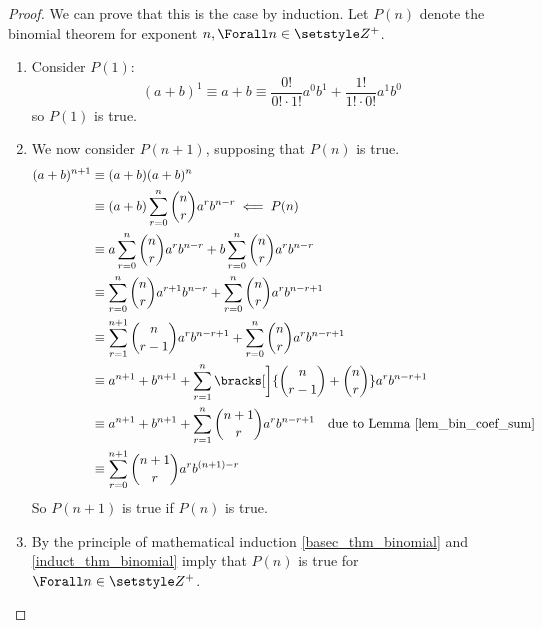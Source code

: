 \begin{proof}
 We can prove that this is the case by induction. Let \(P(n)\) denote the
 binomial theorem for exponent \(n, \Forall n \in \Integers^+\).
 \begin{enumerate}[label=\Roman*.]
  \item \label{basec_thm_binomial} Consider \(P(1)\):
        \begin{equation*}
        (a + b)^1 \equiv a + b
            \equiv \frac{0!}{0!\cdot 1!} a^0b^1 +
                \frac{1!}{1!\cdot 0!} a^1b^0
        \end{equation*}
        so \(P(1)\) is true.
  \item \label{induct_thm_binomial} We now consider \(P(n + 1)\), supposing
        that \(P(n)\) is true.
        \begin{align*}
        (a + b)^{n + 1} &\equiv (a + b)(a + b)^n \\
            &\equiv (a + b)\sum_{r = 0}^n \binom nr a^r b^{n - r}
                \impliedby P(n) \\
            &\equiv a\sum_{r = 0}^n \binom nr a^r b^{n - r}
                + b\sum_{r = 0}^n \binom nr a^r b^{n - r} \\
            &\equiv \sum_{r = 0}^n \binom nr a^{r + 1} b^{n - r}
                + \sum_{r = 0}^n \binom nr a^r b^{n - r + 1} \\
            &\equiv \sum_{r = 1}^{n + 1} \binom n{r - 1} a^r b^{n - r + 1}
                + \sum_{r = 0}^n \binom nr a^r b^{n - r + 1} \\
            &\equiv a^{n + 1} + b^{n + 1}
                + \sum_{r = 1}^n
                      \bracks[\bigg]{\binom n{r - 1} + \binom nr}
                    a^r b^{n - r + 1} \\
            &\equiv a^{n + 1} + b^{n + 1}
                + \sum_{r = 1}^n \binom{n + 1}r a^r b^{n - r + 1}
                    \quad \text{due to Lemma \ref{lem_bin_coef_sum}} \\
            &\equiv \sum_{r = 0}^{n + 1}
                  \binom{n + 1}r a^r b^{(n + 1) - r}
        \end{align*}
        So \(P(n + 1)\) is true if \(P(n)\) is true.
  \item By the principle of mathematical induction
        \ref{basec_thm_binomial} and \ref{induct_thm_binomial} imply
        that \(P(n)\) is true for \(\Forall n \in \Integers^+\). \qedhere
 \end{enumerate}
\end{proof}

